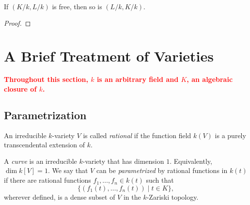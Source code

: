 \begin{proposition}
    If $(K/k, L/k)$ is free, then so is $(L/k, K/k)$.
\end{proposition}
\begin{proof}
    
\end{proof}

\section{A Brief Treatment of Varieties}

\textcolor{red}{\textbf{Throughout this section, $k$ is an arbitrary field and $K$, an algebraic closure of $k$.}}

\subsection{Parametrization}

\begin{definition}
    An irreducible $k$-variety $V$ is called \emph{rational} if the function field $k(V)$ is a purely transcendental extension of $k$.
\end{definition}

\begin{definition}
    A \emph{curve} is an irreducible $k$-variety that has dimension $1$. Equivalently, $\dim k[V] = 1$. We say that $V$ can be \emph{parametrized} by rational functions in $k(t)$ if there are rational functions $f_1,\dots,f_n\in k(t)$ such that 
    \begin{equation*}
        \{(f_1(t),\dots,f_n(t))\mid t\in K\},
    \end{equation*}
    wherever defined, is a dense subset of $V$ in the $k$-Zariski topology.
\end{definition}

